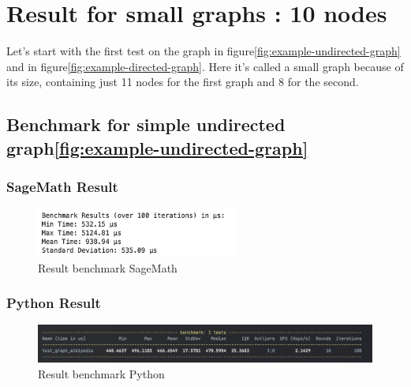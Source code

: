 \section{Result for small graphs : 10 nodes}\label{sec:result-for-small-graphs}

Let's start with the first test on the graph in figure\ref{fig:example-undirected-graph} and in figure\ref{fig:example-directed-graph}.
Here it's called a small graph because of its size, containing just 11 nodes for the first graph and 8 for the second.

\subsection{Benchmark for simple undirected graph\ref{fig:example-undirected-graph}}\label{subsec:benchmark-for-simple-undirected-graph}

\subsubsection*{SageMath Result}

\begin{figure}[!h]
    \centering
    \includegraphics[width=0.60\textwidth]{images/benchmark/graph_wikipedia/benchmark_graph_wikipedia_sagemath}
    \caption{Result benchmark SageMath}
    \label{fig:benchmark-graph-wikipedia-sagemath}
\end{figure}

\subsubsection*{Python Result}
\begin{figure}[!h]
    \centering
    \includegraphics[width=1\textwidth]{images/benchmark/graph_wikipedia/benchmark_graph_wikipedia_python}
    \caption{Result benchmark Python}
    \label{fig:benchmark-graph-wikipedia-python}
\end{figure}

